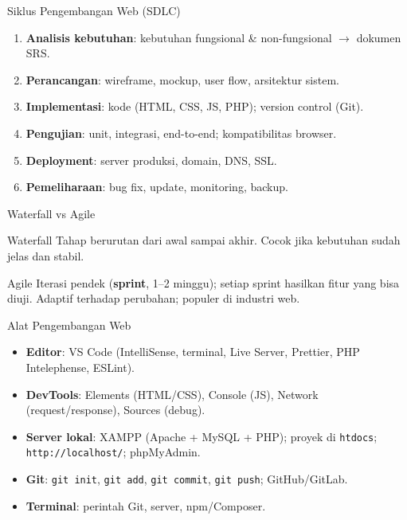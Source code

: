 \documentclass[handout]{beamer}
\begin{document}
\begin{frame}{Siklus Pengembangan Web (SDLC)}
	\begin{enumerate}
		\item \textbf{Analisis kebutuhan}: kebutuhan fungsional \& non-fungsional $\to$ dokumen SRS.
		\item \textbf{Perancangan}: wireframe, mockup, user flow, arsitektur sistem.
		\item \textbf{Implementasi}: kode (HTML, CSS, JS, PHP); version control (Git).
		\item \textbf{Pengujian}: unit, integrasi, end-to-end; kompatibilitas browser.
		\item \textbf{Deployment}: server produksi, domain, DNS, SSL.
		\item \textbf{Pemeliharaan}: bug fix, update, monitoring, backup.
	\end{enumerate}
\end{frame}

\begin{frame}{Waterfall vs Agile}
	\begin{block}{Waterfall}
		Tahap berurutan dari awal sampai akhir. Cocok jika kebutuhan sudah jelas dan stabil.
	\end{block}
	\begin{block}{Agile}
		Iterasi pendek (\textbf{sprint}, 1--2 minggu); setiap sprint hasilkan fitur yang bisa diuji. Adaptif terhadap perubahan; populer di industri web.
	\end{block}
\end{frame}

\begin{frame}{Alat Pengembangan Web}
	\begin{itemize}
		\item \textbf{Editor}: VS Code (IntelliSense, terminal, Live Server, Prettier, PHP Intelephense, ESLint).
		\item \textbf{DevTools}: Elements (HTML/CSS), Console (JS), Network (request/response), Sources (debug).
		\item \textbf{Server lokal}: XAMPP (Apache + MySQL + PHP); proyek di \texttt{htdocs}; \texttt{http://localhost/}; phpMyAdmin.
		\item \textbf{Git}: \texttt{git init}, \texttt{git add}, \texttt{git commit}, \texttt{git push}; GitHub/GitLab.
		\item \textbf{Terminal}: perintah Git, server, npm/Composer.
	\end{itemize}
\end{frame}
\end{document}
